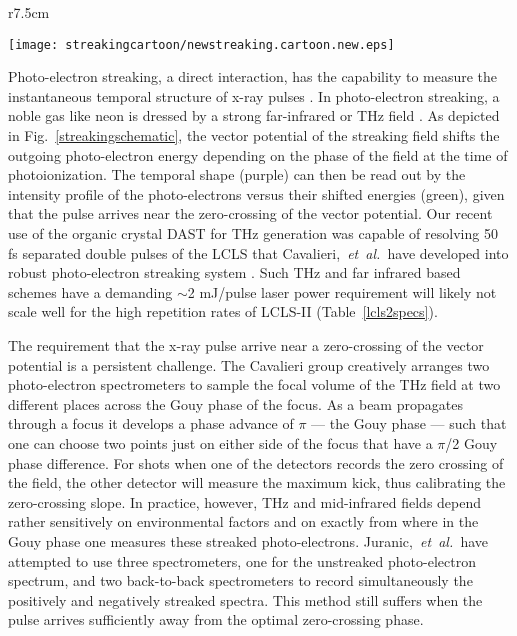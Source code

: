 \documentclass[letterpaper,oneside,11pt]{article}
\newcommand{\etal}{,~\textit{et~al.~}}
\begin{document}
\begin{wrapfigure}[18]{r}{7.5cm}
\vspace{-\baselineskip}
\centerline{
	\texttt{[image: streakingcartoon/newstreaking.cartoon.new.eps]}
}
\vspace{-\baselineskip}
\caption{
	\label{streakingschematic} 
	Schematic of linear photo-electron streaking.
}
\end{wrapfigure}

Photo-electron streaking, a direct interaction, has the capability to measure the instantaneous temporal structure of x-ray pulses \cite{Hentschel2001}.
In photo-electron streaking, a noble gas like neon is dressed by a strong far-infrared or THz field \cite{Helml2014,Juranic2014,Schulz2015}.
As depicted in Fig.~\ref{streakingschematic}, the vector potential of the streaking field shifts the outgoing photo-electron energy depending on the phase of the field at the time of photoionization.
The temporal shape (purple) can then be read out by the intensity profile of the photo-electrons versus their shifted energies (green), given that the pulse arrives near the zero-crossing of the vector potential.
Our recent use of the organic crystal DAST \cite{DAST} for THz generation was capable of resolving 50 fs separated double pulses of the LCLS \cite{Matthias2016} that Cavalieri\etal have developed into robust photo-electron streaking system \cite{Schulz2015}.
Such THz and far infrared based schemes \cite{Helml2014,Juranic2014} have a demanding $\sim$2 mJ/pulse laser power requirement will likely not scale well for the high repetition rates of LCLS-II (Table~\ref{lcls2specs}).

The requirement that the x-ray pulse arrive near a zero-crossing of the vector potential is a persistent challenge.
The Cavalieri group creatively arranges two photo-electron spectrometers to sample the focal volume of the THz field at two different places across the Gouy phase of the focus.
As a beam propagates through a focus it develops a phase advance of $\pi$ --- the Gouy phase --- such that one can choose two points just on either side of the focus that have a $\pi$/2 Gouy phase difference.
For shots when one of the detectors records the zero crossing of the field, the other detector will measure the maximum kick, thus calibrating the zero-crossing slope.
In practice, however, THz and mid-infrared fields depend rather sensitively on environmental factors and on exactly from where in the Gouy phase one measures these streaked photo-electrons.
Juranic\etal have attempted to use three spectrometers, one for the unstreaked photo-electron spectrum, and two back-to-back spectrometers to record simultaneously the positively and negatively streaked spectra.
This method still suffers when the pulse arrives sufficiently away from the optimal zero-crossing phase.
\end{document}
